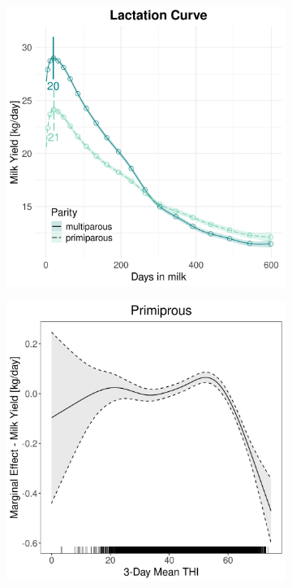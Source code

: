 \begin{figure}[H]
\begin{subfigure}[b]{0.45\textwidth}
        \includegraphics[width=\textwidth]{thesis/figures/models/milk/before2010/bs_milk_before2010/bs_milk_before2010_marginal_dim_milk_combined.png}
    \end{subfigure}
    \begin{subfigure}[b]{0.45\textwidth}
        \centering
        \includegraphics[width=\textwidth]{thesis/figures/models/milk/before2010/bs_milk_before2010/bs_milk_before2010_marginal_thi_milk_primi.png}

\end{subfigure}
\end{figure}
